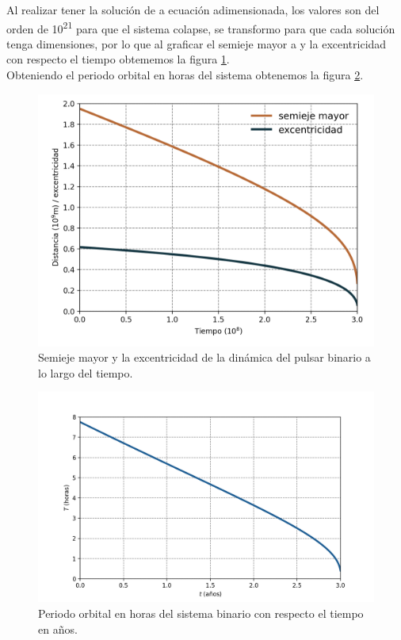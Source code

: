 Al realizar tener la solución de a ecuación adimensionada, los valores son del orden de 10\textsuperscript{21} para que el sistema 
colapse, se transformo para que cada solución tenga dimensiones, por lo que al graficar el semieje mayor a y la excentricidad con respecto el tiempo obtememos la figura
\ref{fig:semieje,excentricidad}.\\
Obteniendo el periodo orbital en horas del sistema obtenemos la figura \ref{fig:periodo}.\\
\begin{minipage}{0.45\linewidth}
    \begin{figure}[H]
        \centering
        \includegraphics[scale=0.4]{images/a_adim.png}
        \caption{Semieje mayor y la excentricidad de la dinámica del pulsar binario a lo largo del tiempo.}
        \label{fig:semieje,excentricidad}
    \end{figure} 
\end{minipage}
\hspace{0.5cm}
\begin{minipage}{0.45\linewidth}
    \vspace{-0.63cm}
    \begin{figure}[H]
        \hspace{-1cm}
        \includegraphics[scale=0.405]{images/periodo.png}
        \caption{Periodo orbital en horas del sistema binario con respecto el tiempo en años.}
        \label{fig:periodo}
    \end{figure}
\end{minipage}\\
